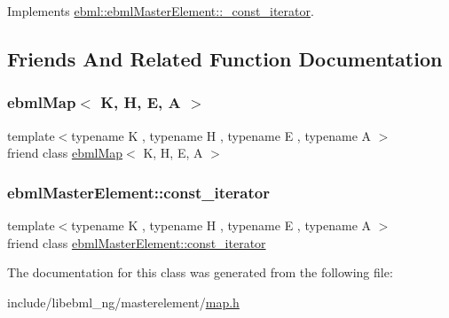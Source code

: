 Implements \mbox{\hyperlink{classebml_1_1ebmlMasterElement_1_1__const__iterator_a936395ed4c0c189a92927bfdf1e28586}{ebml\+::ebml\+Master\+Element\+::\+\_\+const\+\_\+iterator}}.



\subsection{Friends And Related Function Documentation}
\mbox{\label{classebml_1_1ebmlMap_1_1__const__iterator_a691e480013452ea48661a61746fd1b5c}} 
\subsubsection{\texorpdfstring{ebml\+Map$<$ K, H, E, A $>$}{ebmlMap< K, H, E, A >}}
{\footnotesize\ttfamily template$<$typename K , typename H , typename E , typename A $>$ \\
friend class \mbox{\hyperlink{classebml_1_1ebmlMap}{ebml\+Map}}$<$ K, H, E, A $>$\hspace{0.3cm}{\ttfamily [friend]}}

\mbox{\label{classebml_1_1ebmlMap_1_1__const__iterator_a734affd0f736e2e4e03ab2cf8a9f9b26}} 
\subsubsection{\texorpdfstring{ebml\+Master\+Element\+::const\+\_\+iterator}{ebmlMasterElement::const\_iterator}}
{\footnotesize\ttfamily template$<$typename K , typename H , typename E , typename A $>$ \\
friend class \mbox{\hyperlink{classebml_1_1ebmlMasterElement_1_1const__iterator}{ebml\+Master\+Element\+::const\+\_\+iterator}}\hspace{0.3cm}{\ttfamily [friend]}}



The documentation for this class was generated from the following file\+:\begin{DoxyCompactItemize}
\item 
include/libebml\+\_\+ng/masterelement/\mbox{\hyperlink{map_8h}{map.\+h}}\end{DoxyCompactItemize}
